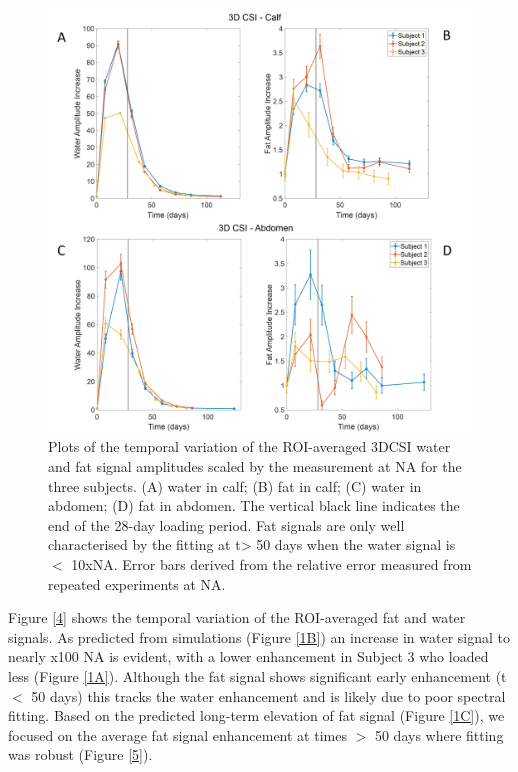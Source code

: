 \documentclass[class=article, crop=false]{standalone}
\begin{document}
\begin{figure}
    \centering
    \includegraphics[width=1\textwidth]{Figures/Lipid/3DCSI_Amplitude.png}
    \caption{Plots of the temporal variation of the ROI-averaged 3DCSI water and fat signal amplitudes scaled by the measurement at NA for the three subjects. (A) water in calf; (B) fat in calf; (C) water in abdomen; (D) fat in abdomen. The vertical black line indicates the end of the 28-day loading period. Fat signals are only well characterised by the fitting at t> 50 days when the water signal is $<$ 10xNA.  Error bars derived from the relative error measured from repeated experiments at NA.}
    \label{fig:Lip:3DCSI}
\end{figure}

Figure \ref{4} shows the temporal variation of the ROI-averaged fat and water signals. As predicted from simulations (Figure \ref{1B}) an increase in water signal to nearly x100 NA is evident, with a lower enhancement in Subject 3 who loaded less (Figure \ref{1A}). Although the fat signal shows significant early enhancement (t $<$ 50 days) this tracks the water enhancement and is likely due to poor spectral fitting. Based on the predicted long-term elevation of fat signal (Figure \ref{1C}), we focused on the average fat signal enhancement at times $>$ 50 days where fitting was robust (Figure \ref{5}). 
\end{document}
